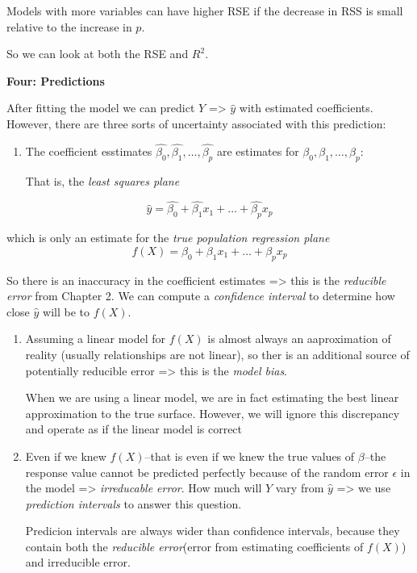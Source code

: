 \documentclass[
  letterpaper,
  DIV=11,
  numbers=noendperiod]{scrreprt}
\begin{document}
Models with more variables can have higher RSE if the decrease in RSS is
small relative to the increase in \(p\).

So we can look at both the RSE and \(R^2\).

\textbf{Four: Predictions}

After fitting the model we can predict \(Y\) =\textgreater{} \(\hat{y}\)
with estimated coefficients. However, there are three sorts of
uncertainty associated with this prediction:

\begin{enumerate}
\def\labelenumi{\arabic{enumi}.}
\item
  The coefficient esstimates
  \(\hat{\beta_0}, \hat{\beta_1},\dots,\hat{\beta_p}\) are estimates for
  \(\beta_0, \beta_1, \dots, \beta_p\):

  That is, the \emph{least squares plane}
\end{enumerate}

\[
\hat{y} = \hat{\beta_0} + \hat{\beta_1}x_1 + \dots +  \hat{\beta_p}x_p
\]

which is only an estimate for the \emph{true population regression
plane} \[
f(X) = \beta_0 + \beta_1x_1 + \dots + \beta_px_p
\]

So there is an inaccuracy in the coefficient estimates =\textgreater{}
this is the \emph{reducible error} from Chapter 2. We can compute a
\emph{confidence interval} to determine how close \(\hat{y}\) will be to
\(f(X)\).

\begin{enumerate}
\def\labelenumi{\arabic{enumi}.}
\setcounter{enumi}{1}
\item
  Assuming a linear model for \(f(X)\) is almost always an aaproximation
  of reality (usually relationships are not linear), so ther is an
  additional source of potentially reducible error =\textgreater{} this
  is the \emph{model bias}.

  When we are using a linear model, we are in fact estimating the best
  linear approximation to the true surface. However, we will ignore this
  discrepancy and operate as if the linear model is correct
\item
  Even if we knew \(f(X)\)--that is even if we knew the true values of
  \(\beta\)--the response value cannot be predicted perfectly because of
  the random error \(\epsilon\) in the model =\textgreater{}
  \emph{irreducable error}. How much will \(Y\) vary from \(\hat{y}\)
  =\textgreater{} we use \emph{prediction intervals} to answer this
  question.

  Predicion intervals are always wider than confidence intervals,
  because they contain both the \emph{reducible error}(error from
  estimating coefficients of \(f(X)\)) and irreducible error.
\end{enumerate}
\end{document}
